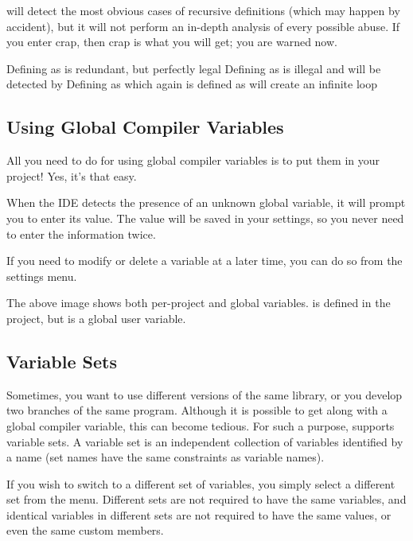\codeblocks will detect the most obvious cases of recursive definitions (which may happen by accident), but it will not perform an in-depth analysis of every possible abuse. If you enter crap, then crap is what you will get; you are warned now.


Defining  as  is redundant, but perfectly legal
Defining  as  is illegal and will be detected by \codeblocks
Defining  as  which again is defined as  will create an infinite loop

\subsection{Using Global Compiler Variables}

All you need to do for using global compiler variables is to put them in your project! Yes, it's that easy.

When the IDE detects the presence of an unknown global variable, it will prompt you to enter its value. The value will be saved in your settings, so you never need to enter the information twice.

If you need to modify or delete a variable at a later time, you can do so from the settings menu.




The above image shows both per-project and global variables.  is defined in the project, but  is a global user variable.

\subsection{Variable Sets}

Sometimes, you want to use different versions of the same library, or you develop two branches of the same program. Although it is possible to get along with a global compiler variable, this can become tedious. For such a purpose, \codeblocks supports variable sets. A variable set is an independent collection of variables identified by a name (set names have the same constraints as variable names).

If you wish to switch to a different set of variables, you simply select a different set from the menu. Different sets are not required to have the same variables, and identical variables in different sets are not required to have the same values, or even the same custom members.

